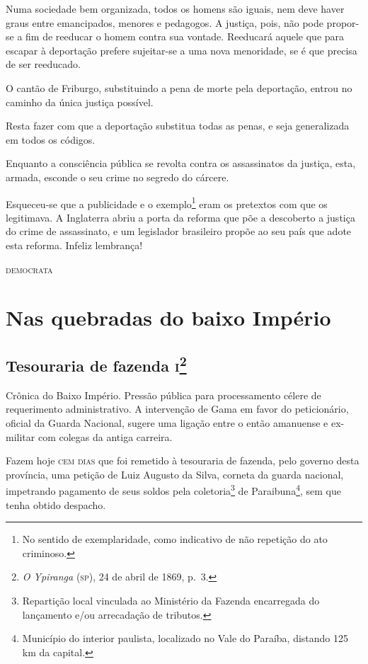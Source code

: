 Numa sociedade bem organizada, todos os homens são iguais, nem deve
haver graus entre emancipados, menores e pedagogos. A justiça, pois, não
pode propor-se a fim de reeducar o homem contra sua vontade. Reeducará
aquele que para escapar à deportação prefere sujeitar-se a uma nova
menoridade, se é que precisa de ser reeducado.

O cantão de Friburgo, substituindo a pena de morte pela deportação,
entrou no caminho da única justiça possível.

Resta fazer com que a deportação substitua todas as penas, e seja
generalizada em todos os códigos.

Enquanto a consciência pública se revolta contra os assassinatos da
justiça, esta, armada, esconde o seu crime no segredo do cárcere.

Esqueceu-se que a publicidade e o exemplo\footnote{No sentido de
  exemplaridade, como indicativo de não repetição do ato criminoso.}
eram os pretextos com que os legitimava. A Inglaterra abriu a porta da
reforma que põe a descoberto a justiça do crime de assassinato, e um
legislador brasileiro propõe ao seu país que adote esta reforma. Infeliz
lembrança!

\begin{flushright}
\textsc{democrata}
\end{flushright}

\part{Nas quebradas do baixo Império} %

\chapter{Tesouraria de fazenda \textsc{i}\footnote{\emph{O Ypiranga} (\textsc{sp}),
  24 de abril de 1869, p.~3.}}

\begin{didascalia}
Crônica do Baixo Império. Pressão pública para processamento célere de
requerimento administrativo. A intervenção de Gama em favor do
peticionário, oficial da Guarda Nacional, sugere uma ligação entre o
então amanuense e ex-militar com colegas da antiga carreira.
\end{didascalia}


Fazem hoje \textsc{cem dias} que foi remetido à tesouraria de fazenda, pelo
governo desta província, uma petição de Luiz Augusto da Silva, corneta
da guarda nacional, impetrando pagamento de seus soldos pela
coletoria\footnote{Repartição local vinculada ao Ministério da Fazenda
  encarregada do lançamento e/ou arrecadação de tributos.} de
Paraibuna\footnote{Município do interior paulista, localizado no Vale
  do Paraíba, distando 125 km da capital.}, sem que tenha obtido
despacho.

